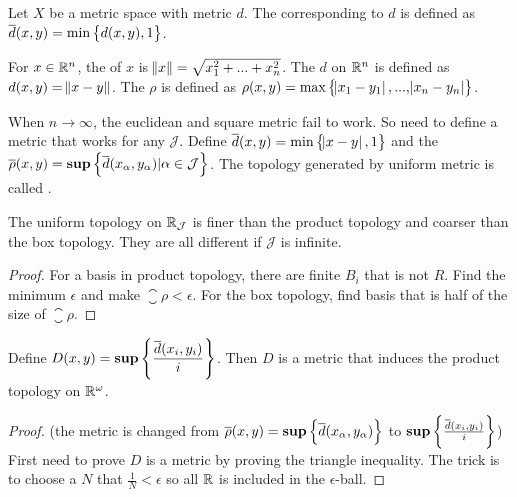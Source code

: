 \begin{definition}
    Let $X$ be a metric space with metric $d$. The  corresponding to $d$ is defined as $\overline{d}(x,y) = \text{min}\set{d(x,y), 1} $.
\end{definition}

\begin{definition}
    For $x \in \mathbb{R}^n$, the  of $x$ is $\norm{x} = \sqrt{x_1^2 + ... + x_n^2}$. The  $d$ on $\mathbb{R}^n$ is defined as $d(x,y) = \norm{x - y}$. The  $\rho$ is defined as $\rho (x,y) = \text{max}\set{\abs{x_1 - y_1}, ... , \abs{x_n - y_n} }$.
\end{definition}

\begin{definition}
    When $n \rightarrow \infty$, the euclidean and square metric fail to work. So need to define a metric that works for any $\mathcal{J}$. Define $\overline{d}(x,y) = \text{min}\set{\abs{x - y} , 1}$ and the  $\overline{\rho}(x,y) = \mathbf{sup} \set{ \overline{d}(x_{\alpha}, y_{\alpha}) | \alpha \in \mathcal{J}} $. The topology generated by uniform metric is called .
\end{definition}

\begin{theorem}
The uniform topology on $\mathbb{R}_{\mathcal{J}}$ is finer than the product topology and coarser than the box topology. They are all different if $\mathcal{J}$ is infinite.
\end{theorem}
\begin{proof}
    For a basis in product topology, there are finite $B_i$ that is not $R$. Find the minimum $\epsilon$ and make $\closure{\rho} < \epsilon$. For the box topology, find basis that is half of the size of $\closure{\rho}$.
\end{proof}

\begin{theorem}
    Define $\displaystyle D(x,y) = \mathbf{sup} \set{\frac{\overline{d}(x_i, y_i )}{i}} $. Then $D$ is a metric that induces the product topology on $\mathbb{R}^\omega$.
\end{theorem}
\begin{proof}
    (the metric is changed from $\overline{\rho}(x,y) = \mathbf{sup} \set{ \overline{d}(x_{\alpha}, y_{\alpha})} $ to $\mathbf{sup} \set{\frac{\overline{d}(x_i, y_i )}{i}} $) First need to prove $D$ is a metric by proving the triangle inequality. The trick is to choose a $N$ that $\frac{1}{N} < \epsilon$ so all $\mathbb{R}$ is included in the $\epsilon$-ball.
\end{proof}

